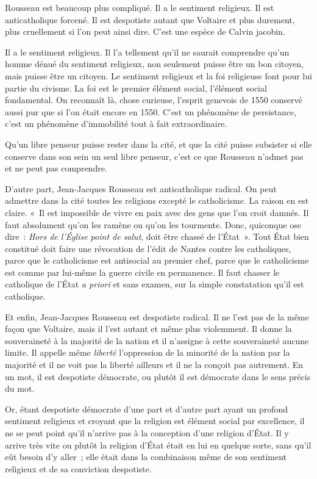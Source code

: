 \documentclass[french,twoside]{book} %
\begin{document}
Rousseau est beaucoup plus compliqué. Il a le sentiment religieux. Il est anticatholique forcené. Il est despotiste autant que Voltaire et plus durement, plus cruellement si l’on peut ainsi dire. C’est une espèce de Calvin jacobin.\par
Il a le sentiment religieux. Il l’a tellement qu’il ne saurait comprendre qu’un homme dénué du sentiment religieux, non seulement puisse être un bon citoyen, mais puisse être un citoyen. Le sentiment  religieux et la foi religieuse font pour lui partie du civisme. La foi est le premier élément social, l’élément social fondamental. On reconnaît là, chose curieuse, l’esprit genevois de 1550 conservé aussi pur que si l’on était encore en 1550. C’est un phénomène de persistance, c’est un phénomène d’immobilité tout à fait extraordinaire.\par
Qu’un libre penseur puisse rester dans la cité, et que la cité puisse subsister si elle conserve dans son sein un seul libre penseur, c’est ce que Rousseau n’admet pas et ne peut pas comprendre.\par
D’autre part, Jean-Jacques Rousseau est anticatholique radical. On peut admettre dans la cité toutes les religions excepté le catholicisme. La raison en est claire. « Il est impossible de vivre en paix avec des gens que l’on croit damnés. Il faut absolument qu’on les ramène ou qu’on les tourmente. Donc, quiconque ose dire : {\itshape Hors de l’Église point de salut}, doit être chassé de l’État ». Tout État bien constitué doit faire une révocation de l’édit de Nantes contre les catholiques, parce que le catholicisme est antisocial au premier chef, parce que le catholicisme est comme par lui-même la guerre civile en permanence. Il faut chasser le catholique de l’État {\itshape a priori} et sans examen, sur la simple constatation qu’il est catholique.\par
Et enfin, Jean-Jacques Rousseau est despotiste  radical. Il ne l’est pas de la même façon que Voltaire, mais il l’est autant et même plus violemment. Il donne la souveraineté à la majorité de la nation et il n’assigne à cette souveraineté aucune limite. Il appelle même {\itshape liberté} l’oppression de la minorité de la nation par la majorité et il ne voit pas la liberté ailleurs et il ne la conçoit pas autrement. En un mot, il est despotiste démocrate, ou plutôt il est démocrate dans le sens précis du mot.\par
Or, étant despotiste démocrate d’une part et d’autre part ayant un profond sentiment religieux et croyant que la religion est élément social par excellence, il ne se peut point qu’il n’arrive pas à la conception d’une religion d’État. Il y arrive très vite ou plutôt la religion d’État était en lui en quelque sorte, sans qu’il eût besoin d’y aller ; elle était dans la combinaison même de son sentiment religieux et de sa conviction despotiste.\par
\end{document}
